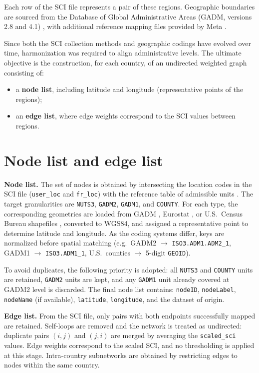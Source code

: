 Each row of the SCI file represents a pair of these regions. Geographic boundaries are sourced from the Database of Global Administrative Areas (GADM, versions 2.8 and 4.1) \cite{gadm}, with additional reference mapping files provided by Meta \cite{gadm1nuts2csv}.  

Since both the SCI collection methods and geographic codings have evolved over time, harmonization was required to align administrative levels.  
The ultimate objective is the construction, for each country, of an undirected weighted graph consisting of:  
\begin{itemize}
    \item a \textbf{node list}, including latitude and longitude (representative points of the regions);  
    \item an \textbf{edge list}, where edge weights correspond to the SCI values between regions.  
\end{itemize}

\section{Node list and edge list}

\textbf{Node list.}  
The set of nodes is obtained by intersecting the location codes in the SCI file (\texttt{user\_loc} and \texttt{fr\_loc}) with the reference table of admissible units \cite{gadm1nuts2csv}. The target granularities are \texttt{NUTS3}, \texttt{GADM2}, \texttt{GADM1}, and \texttt{COUNTY}. For each type, the corresponding geometries are loaded from GADM \cite{gadm}, Eurostat \cite{eurostatNUTS}, or U.S.\ Census Bureau shapefiles \cite{uscensusCounties}, converted to WGS84, and assigned a representative point to determine latitude and longitude.  
As the coding systems differ, keys are normalized before spatial matching (e.g.\ GADM2 $\rightarrow$ \texttt{ISO3.ADM1.ADM2\_1}, GADM1 $\rightarrow$ \texttt{ISO3.ADM1\_1}, U.S.\ counties $\rightarrow$ 5-digit \texttt{GEOID}).  

To avoid duplicates, the following priority is adopted: all \texttt{NUTS3} and \texttt{COUNTY} units are retained, \texttt{GADM2} units are kept, and any \texttt{GADM1} unit already covered at GADM2 level is discarded.  
The final node list contains: \texttt{nodeID}, \texttt{nodeLabel}, \texttt{nodeName} (if available), \texttt{latitude}, \texttt{longitude}, and the dataset of origin.  

\textbf{Edge list.}  
From the SCI file, only pairs with both endpoints successfully mapped are retained. Self-loops are removed and the network is treated as undirected: duplicate pairs $(i,j)$ and $(j,i)$ are merged by averaging the \texttt{scaled\_sci} values. Edge weights correspond to the scaled SCI, and no thresholding is applied at this stage. Intra-country subnetworks are obtained by restricting edges to nodes within the same country.  


